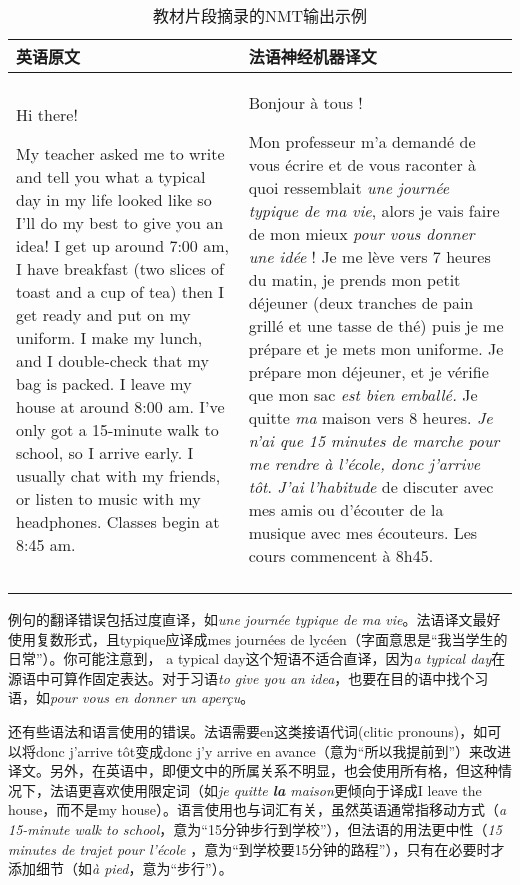 \documentclass[output=paper,colorlinks,citecolor=brown]{langscibook}
\begin{document}
\begin{table}
\begin{tabularx}{\textwidth}{L{5.1cm}L{6.5cm}}

\lsptoprule
{英语原文} & {法语神经机器译文}\\
\midrule
Hi there!

My teacher asked me to write and tell you what a typical day in my life looked like so I’ll do my best to give you an idea! I get up around 7:00 am, I have breakfast (two slices of toast and a cup of tea) then I get ready and put on my uniform. I make my lunch, and I double-check that my bag is packed. I leave my house at around 8:00 am. I’ve only got a 15-minute walk to school, so I arrive early. I usually chat with my friends, or listen to music with my headphones. Classes begin at 8:45 am. & Bonjour à tous !

Mon professeur m'a demandé de vous écrire et de vous raconter à quoi ressemblait \textit{une journée typique de ma vie}, alors je vais faire de mon mieux \textit{pour vous donner une idée} ! Je me lève vers 7 heures du matin, je prends mon petit déjeuner (deux tranches de pain grillé et une tasse de thé) puis je me prépare et je mets mon uniforme. Je prépare mon déjeuner, et je vérifie que mon sac \textit{est bien emballé.} Je quitte \textit{ma} maison vers 8 heures. \textit{Je n'ai que 15 minutes de marche pour me rendre à l'école, donc j'arrive tôt}. \textit{J'ai l'habitude} de discuter avec mes amis ou d'écouter de la musique avec mes écouteurs. Les cours commencent à 8h45.\\
\lspbottomrule
\end{tabularx}
\caption{教材片段摘录的NMT输出示例} 
\label{tab:carre:4}
\end{table}

例句的翻译错误包括过度直译，如\textit{une journée typique de ma vie}。法语译文最好使用复数形式，且typique应译成mes journées de lycéen（字面意思是“我当学生的日常”）。你可能注意到， a typical day这个短语不适合直译，因为\textit{a typical day}在源语中可算作固定表达。对于习语\textit{to give you an idea}，也要在目的语中找个习语，如\textit{pour vous en donner un aperçu}。

还有些语法和语言使用的错误。法语需要en这类接语代词(clitic pronouns)，如可以将donc j’arrive tôt变成donc j’y arrive en avance（意为“所以我提前到”）来改进译文。另外，在英语中，即便文中的所属关系不明显，也会使用所有格，但这种情况下，法语更喜欢使用限定词（如\textit{je quitte \textbf{la} maison}更倾向于译成I leave the house，而不是my house）。语言使用也与词汇有关，虽然英语通常指移动方式（\textit{a 15-minute walk to school}，意为“15分钟步行到学校”），但法语的用法更中性（\textit{15 minutes de trajet pour l’école} ，意为“到学校要15分钟的路程”），只有在必要时才添加细节（如\textit{à pied}，意为“步行”）。
\end{document}
